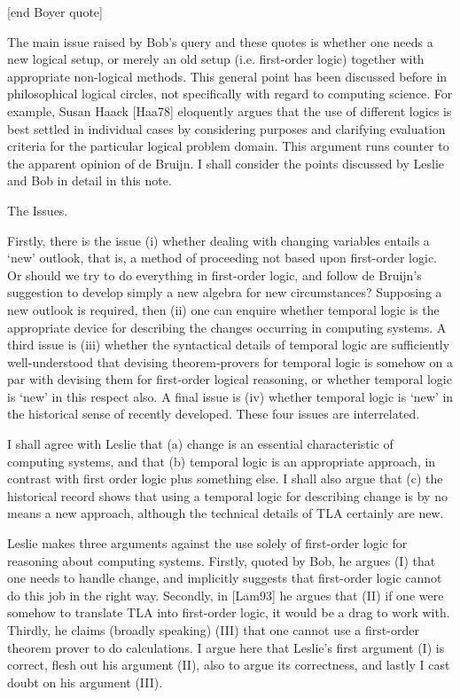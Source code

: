 \begin{spec}

[end Boyer quote]

The main issue raised by Bob's query and these quotes is whether one
needs a new logical setup, or merely an old setup (i.e. first-order
logic) together with appropriate non-logical methods.  This general
point has been discussed before in philosophical logical circles,
not specifically with regard to computing science.  For example,
Susan Haack [Haa78] eloquently argues that the use of different
logics is best settled in individual cases by considering purposes
and clarifying evaluation criteria for the particular logical
problem domain. This argument runs counter to the apparent opinion
of de Bruijn.  I shall consider the points discussed by Leslie and
Bob in detail in this note.

The Issues.

Firstly, there is the issue (i) whether dealing with changing
variables entails a `new' outlook, that is, a method of proceeding
not based upon first-order logic.  Or should we try to do everything
in first-order logic, and follow de Bruijn's suggestion to develop
simply a new algebra for new circumstances?  Supposing a new outlook
is required, then (ii) one can enquire whether temporal logic is the
appropriate device for describing the changes occurring in computing
systems.  A third issue is (iii) whether the syntactical details of
temporal logic are sufficiently well-understood that devising
theorem-provers for temporal logic is somehow on a par with devising
them for first-order logical reasoning, or whether temporal logic is
`new' in this respect also.  A final issue is (iv) whether temporal
logic is `new' in the historical sense of recently developed.
These four issues are interrelated.

I shall agree with Leslie that (a) change is an essential
characteristic of computing systems, and that (b) temporal logic is
an appropriate approach, in contrast with first order logic plus
something else.  I shall also argue that (c) the historical record
shows that using a temporal logic for describing change is by no
means a new approach, although the technical details of TLA
certainly are new.

Leslie makes three arguments against the use solely of first-order
logic for reasoning about computing systems.  Firstly, quoted by
Bob, he argues (I) that one needs to handle change, and implicitly
suggests that first-order logic cannot do this job in the right way.
Secondly, in [Lam93] he argues that (II) if one were somehow to
translate TLA into first-order logic, it would be a drag to work
with.  Thirdly, he claims (broadly speaking) (III) that one cannot
use a first-order theorem prover to do calculations. I argue here
that Leslie's first argument (I) is correct, flesh out his argument
(II), also to argue its correctness, and lastly I cast doubt on his
argument (III).


\end{spec}
